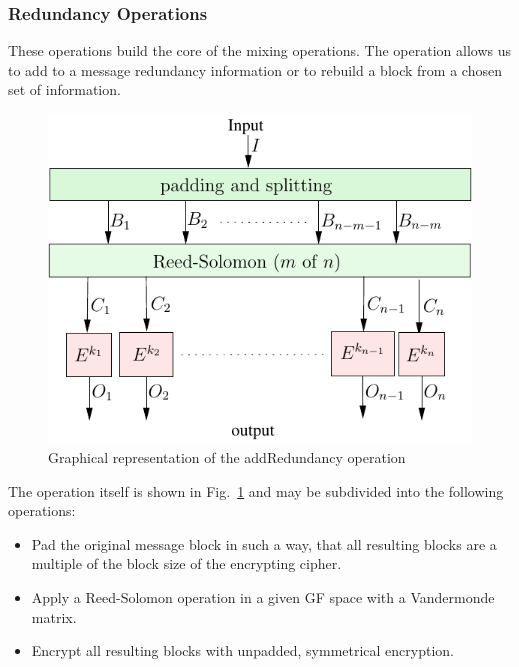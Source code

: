 \documentclass[acmsmall, screen]{acmart}
\begin{document}
%
%

\subsubsection{Redundancy Operations}
These operations build the core of the mixing operations. The operation allows us to add to a message redundancy information or to rebuild a block from a chosen set of information. 

\begin{figure}[ht]\centering
	\includegraphics[width=0.5\columnwidth]{../../inc/addRedundancyOp}
	\caption{Graphical representation of the addRedundancy operation}
	\label{fig:addRedundancyOperation}
\end{figure}

The operation itself is shown in Fig.~\ref{fig:addRedundancyOperation} and may be subdivided into the following operations:
\begin{itemize}
	\item Pad the original message block in such a way, that all resulting blocks are a multiple of the block size of the encrypting cipher.
	\item Apply a Reed-Solomon operation in a given GF space with a Vandermonde matrix.
	\item Encrypt all resulting blocks with unpadded, symmetrical encryption.
\end{itemize}
\end{document}
